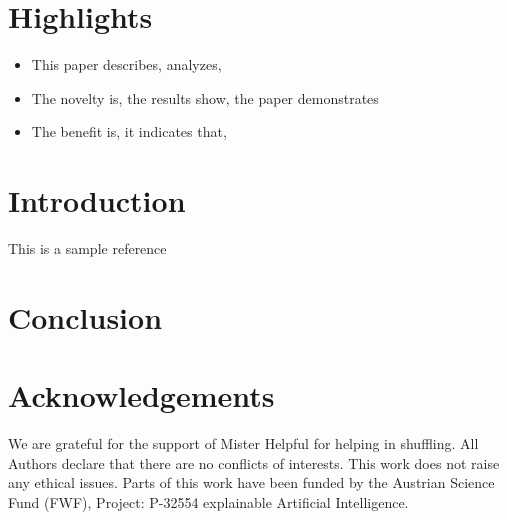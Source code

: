 \documentclass[a4paper,5p,review]{elsarticle}
\begin{document}

\section*{\textbf{Highlights}}

\begin{itemize}
    \item This paper describes, analyzes, 
    \item The novelty is, the results show, the paper demonstrates
    \item The benefit is, it indicates that, 
\end{itemize}

\section{Introduction}
\label{sec:Introduction}

This is a sample reference \cite{HolzingerEtAl:2021:GraphFusion}


\section{Conclusion}
\label{sec:Conclusion}


\section*{Acknowledgements}

We are grateful for the support of Mister Helpful for helping in shuffling. All Authors declare that there are no conflicts of interests. This work does not raise any ethical issues. Parts of this work have been funded by the Austrian Science Fund (FWF), Project: P-32554 explainable Artificial Intelligence. 





\end{document}
